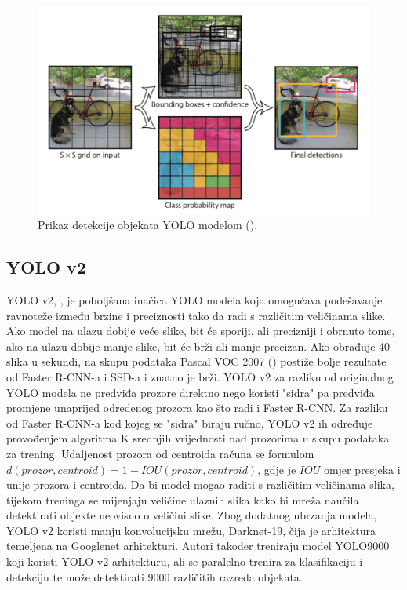  \begin{figure}
	\centering
	\includegraphics[scale=0.8]{img/yolo_detekcija.png}
	\caption{Prikaz detekcije objekata YOLO modelom (\cite{DBLP:journals/corr/RedmonDGF15}).}
	\label{yolo_detekcija}
\end{figure}

\subsection{YOLO v2}
YOLO v2, \cite{DBLP:journals/corr/RedmonF16}, je poboljšana inačica YOLO modela koja omogućava podešavanje ravnoteže između brzine i preciznosti tako da radi s različitim veličinama slike. Ako model na ulazu dobije veće slike, bit će sporiji, ali precizniji i obrnuto tome, ako na ulazu dobije manje slike, bit će brži ali manje precizan. Ako obrađuje 40 slika u sekundi, na skupu podataka Pascal VOC 2007 (\cite{pascal-voc-2007}) postiže bolje rezultate od Faster R-CNN-a i SSD-a i znatno je brži. YOLO v2 za razliku od originalnog YOLO modela ne predviđa prozore direktno nego koristi "sidra" pa predviđa promjene unaprijed određenog prozora kao što radi i Faster R-CNN. Za razliku od Faster R-CNN-a kod kojeg se "sidra" biraju ručno, YOLO v2 ih određuje provođenjem algoritma K srednjih vrijednosti nad prozorima u skupu podataka za trening. Udaljenost prozora od centroida računa se formulom $d(prozor, centroid) = 1 - IOU(prozor, centroid)$, gdje je $IOU$ omjer presjeka i unije prozora i centroida.
Da bi model mogao raditi s različitim veličinama slika, tijekom treninga se mijenjaju veličine ulaznih slika kako bi mreža naučila detektirati objekte neovisno o veličini slike.  
Zbog dodatnog ubrzanja modela, YOLO v2 koristi manju konvolucijsku mrežu, Darknet-19, čija je arhitektura temeljena na Googlenet arhitekturi. 
Autori također treniraju model YOLO9000 koji koristi YOLO v2 arhitekturu, ali se paralelno trenira za klasifikaciju i detekciju te može detektirati 9000 različitih razreda objekata.

